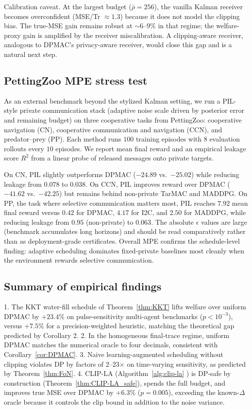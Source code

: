 \documentclass{article}
\begin{document}

Calibration caveat. At the largest budget ($\bar\rho = 256$), the vanilla Kalman receiver becomes overconfident (MSE/Tr $\approx 1.3$) because it does not model the clipping bias. The true-MSE gain remains robust at $\sim$6–9\% in that regime; the welfare-proxy gain is amplified by the receiver miscalibration. A clipping-aware receiver, analogous to DPMAC's privacy-aware receiver, would close this gap and is a natural next step.

\subsection{PettingZoo MPE stress test}

As an external benchmark beyond the stylized Kalman setting, we run a PIL-style private communication stack (adaptive noise scale driven by posterior error and remaining budget) on three cooperative tasks from PettingZoo: cooperative navigation (CN), cooperative communication and navigation (CCN), and predator–prey (PP). Each method runs $100$ training episodes with $8$ evaluation rollouts every $10$ episodes. We report mean final reward and an empirical leakage score $R^2$ from a linear probe of released messages onto private targets.

On CN, PIL slightly outperforms DPMAC ($-24.89$ vs.\ $-25.02$) while reducing leakage from $0.078$ to $0.038$. On CCN, PIL improves reward over DPMAC ($-41.62$ vs.\ $-42.25$) but remains behind non-private TarMAC and MADDPG. On PP, the task where selective communication matters most, PIL reaches $7.92$ mean final reward versus $0.42$ for DPMAC, $4.17$ for I2C, and $2.50$ for MADDPG, while reducing leakage from $0.95$ (non-private) to $0.063$. The absolute $\epsilon$ values are large (benchmark accumulates long horizons) and should be read comparatively rather than as deployment-grade certificates. Overall MPE confirms the schedule-level finding: adaptive scheduling dominates fixed-private baselines most cleanly when the environment rewards selective communication.

\subsection{Summary of empirical findings}

1. The KKT water-fill schedule of Theorem~\ref{thm:KKT} lifts welfare over uniform DPMAC by $+23.4\%$ on pulse-sensitivity multi-agent benchmarks ($p<10^{-3}$), versus $+7.5\%$ for a precision-weighted heuristic, matching the theoretical gap predicted by Corollary 2.
2. In the homogeneous final-trace regime, uniform DPMAC matches the numerical oracle to four decimals, consistent with Corollary~\ref{cor:DPMAC}.
3. Naive learning-augmented scheduling without clipping violates DP by factors of 2–23$\times$ on time-varying sensitivity, as predicted by Theorem~\ref{thm:FoN}.
4. CLIP-LA (Algorithm~\ref{alg:clip-la} ) is DP-safe by construction (Theorem~\ref{thm:CLIP-LA_safe}), spends the full budget, and improves true MSE over DPMAC by $+6.3\%$ ($p = 0.005$), exceeding the known-$\Delta$ oracle because it controls the clip bound in addition to the noise variance.
\end{document}
